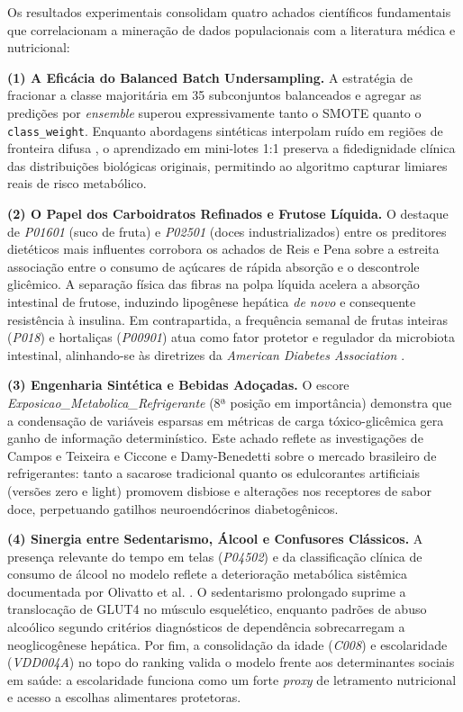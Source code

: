 \documentclass[12pt, a4paper]{article}
\begin{document}
    Os resultados experimentais consolidam quatro achados científicos fundamentais que correlacionam a mineração de dados populacionais com a literatura médica e nutricional:

    \textbf{(1) A Eficácia do Balanced Batch Undersampling.} A estratégia de fracionar a classe majoritária em 35 subconjuntos balanceados e agregar as predições por \textit{ensemble} superou expressivamente tanto o SMOTE quanto o \texttt{class\_weight}. Enquanto abordagens sintéticas interpolam ruído em regiões de fronteira difusa \cite{chawla2002smote}, o aprendizado em mini-lotes 1:1 preserva a fidedignidade clínica das distribuições biológicas originais, permitindo ao algoritmo capturar limiares reais de risco metabólico.

    \textbf{(2) O Papel dos Carboidratos Refinados e Frutose Líquida.} O destaque de \textit{P01601} (suco de fruta) e \textit{P02501} (doces industrializados) entre os preditores dietéticos mais influentes corrobora os achados de Reis e Pena \cite{reis2020associacao} sobre a estreita associação entre o consumo de açúcares de rápida absorção e o descontrole glicêmico. A separação física das fibras na polpa líquida acelera a absorção intestinal de frutose, induzindo lipogênese hepática \textit{de novo} e consequente resistência à insulina. Em contrapartida, a frequência semanal de frutas inteiras (\textit{P018}) e hortaliças (\textit{P00901}) atua como fator protetor e regulador da microbiota intestinal, alinhando-se às diretrizes da \textit{American Diabetes Association} \cite{ada2024standards}.

    \textbf{(3) Engenharia Sintética e Bebidas Adoçadas.} O escore \textit{Exposicao\_Metabolica\_Refrigerante} (8ª posição em importância) demonstra que a condensação de variáveis esparsas em métricas de carga tóxico-glicêmica gera ganho de informação determinístico. Este achado reflete as investigações de Campos e Teixeira \cite{campos2023investigacao} e Ciccone e Damy-Benedetti \cite{ciccone2019aceitabilidade} sobre o mercado brasileiro de refrigerantes: tanto a sacarose tradicional quanto os edulcorantes artificiais (versões zero e light) promovem disbiose e alterações nos receptores de sabor doce, perpetuando gatilhos neuroendócrinos diabetogênicos.

    \textbf{(4) Sinergia entre Sedentarismo, Álcool e Confusores Clássicos.} A presença relevante do tempo em telas (\textit{P04502}) e da classificação clínica de consumo de álcool no modelo reflete a deterioração metabólica sistêmica documentada por Olivatto et al. \cite{olivatto2018analise}. O sedentarismo prolongado suprime a translocação de GLUT4 no músculo esquelético, enquanto padrões de abuso alcoólico segundo critérios diagnósticos de dependência \cite{gigliotti2004sindrome} sobrecarregam a neoglicogênese hepática. Por fim, a consolidação da idade (\textit{C008}) e escolaridade (\textit{VDD004A}) no topo do ranking valida o modelo frente aos determinantes sociais em saúde: a escolaridade funciona como um forte \textit{proxy} de letramento nutricional e acesso a escolhas alimentares protetoras.

\newpage


\end{document}
